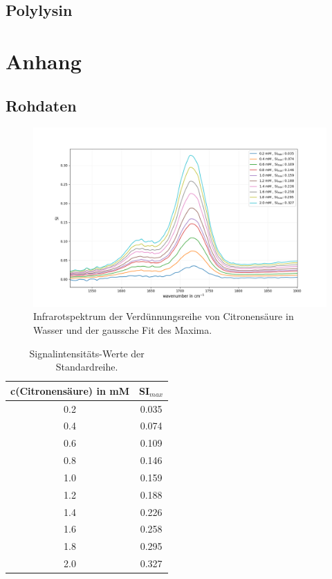 \documentclass[10pt,a4paper]{article}
\begin{document}
			\subsection{Polylysin}
		
		
		
		
		
	\section{Anhang}
		\subsection{Rohdaten}
		
			\begin{figure}[H]
				\centering
				\includegraphics[scale=0.55]{Standardcurve_citricacid.png}
				\caption{Infrarotspektrum der Verdünnungsreihe von Citronensäure in Wasser und der gaussche Fit des Maxima.}
				\label{fig:IR_Standardcurve}
			\end{figure}
			
			\begin{table}[H]
				\centering
				\caption{Signalintensitäts-Werte der Standardreihe.}
				\label{tab:r_square_standardcurve}
				\begin{tabular}{cc}
					\toprule
					c(Citronensäure) in mM & SI$_{max}$\\
					\midrule
					0.2	&0.035\\
					0.4	&0.074\\
					0.6	&0.109\\
					0.8	&0.146\\
					1.0	&0.159\\
					1.2	&0.188\\
					1.4	&0.226\\
					1.6	&0.258\\
					1.8	&0.295\\
					2.0	&0.327\\
					\bottomrule
				\end{tabular}
			\end{table}	
			
\end{document}

